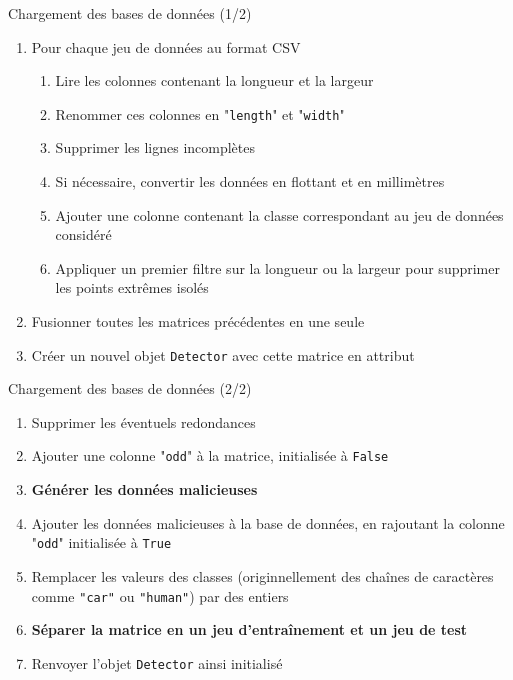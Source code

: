 \documentclass[usenames,dvipsnames]{beamer}
\begin{document}
\begin{frame}{Chargement des bases de données (1/2)}

\begin{enumerate}
\item Pour chaque jeu de données au format CSV
\begin{enumerate}[{1.}1.]
\item Lire les colonnes contenant la longueur et la largeur
\item Renommer ces colonnes en "\texttt{length}" et "\texttt{width}"
\item Supprimer les lignes incomplètes
\item Si nécessaire, convertir les données en flottant et en millimètres
\item Ajouter une colonne contenant la classe correspondant au jeu de données considéré
\item Appliquer un premier filtre sur la longueur ou la largeur pour supprimer les points extrêmes isolés
\end{enumerate}
\item Fusionner toutes les matrices précédentes en une seule
\item Créer un nouvel objet \texttt{Detector} avec cette matrice en attribut
\end{enumerate}

\end{frame}

\begin{frame}{Chargement des bases de données (2/2)}
\begin{enumerate}
\item Supprimer les éventuels redondances
\item Ajouter une colonne "\texttt{odd}" à la matrice, initialisée à \texttt{False}
\item \textbf{Générer les données malicieuses}
\item Ajouter les données malicieuses à la base de données, en rajoutant la colonne "\texttt{odd}" initialisée à \texttt{True}
\item Remplacer les valeurs des classes (originnellement des chaînes de caractères comme \texttt{"car"} ou \texttt{"human"}) par des entiers
\item \textbf{Séparer la matrice en un jeu d'entraînement et un jeu de test}
\item Renvoyer l'objet \texttt{Detector} ainsi initialisé
\end{enumerate}
\end{frame}
\end{document}
